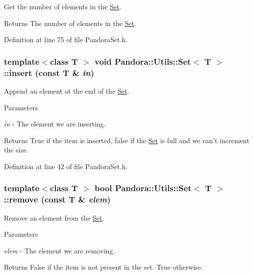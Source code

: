 Get the number of elements in the \hyperlink{classPandora_1_1Utils_1_1Set}{Set}. \begin{DoxyReturn}{Returns}
The number of elements in the \hyperlink{classPandora_1_1Utils_1_1Set}{Set}. 
\end{DoxyReturn}


Definition at line 75 of file PandoraSet.h.\hypertarget{classPandora_1_1Utils_1_1Set_a2c43d731fac0319a5be8c055aae33c8b}{
\subsubsection[{insert}]{\setlength{\rightskip}{0pt plus 5cm}template$<$class T $>$ void {\bf Pandora::Utils::Set}$<$ T $>$::insert (const T \& {\em in})}}
\label{classPandora_1_1Utils_1_1Set_a2c43d731fac0319a5be8c055aae33c8b}


Append an element at the end of the \hyperlink{classPandora_1_1Utils_1_1Set}{Set}. 
\begin{DoxyParams}{Parameters}
\item[{\em in}]-\/ The element we are inserting. \end{DoxyParams}
\begin{DoxyReturn}{Returns}
True if the item is inserted, false if the \hyperlink{classPandora_1_1Utils_1_1Set}{Set} is full and we can't increment the size. 
\end{DoxyReturn}


Definition at line 42 of file PandoraSet.h.\hypertarget{classPandora_1_1Utils_1_1Set_a5094548bb7e9ac74ebc29ae0c4f426a5}{
\subsubsection[{remove}]{\setlength{\rightskip}{0pt plus 5cm}template$<$class T $>$ bool {\bf Pandora::Utils::Set}$<$ T $>$::remove (const T \& {\em elem})}}
\label{classPandora_1_1Utils_1_1Set_a5094548bb7e9ac74ebc29ae0c4f426a5}


Remove an element from the \hyperlink{classPandora_1_1Utils_1_1Set}{Set}. 
\begin{DoxyParams}{Parameters}
\item[{\em elem}]-\/ The element we are removing. \end{DoxyParams}
\begin{DoxyReturn}{Returns}
False if the item is not present in the set. True otherwise. 
\end{DoxyReturn}


